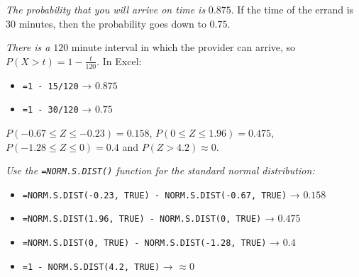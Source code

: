 \documentclass[
  11pt,
  letterpaper,
  DIV=11,
  numbers=noendperiod,
  oneside,
  open=any]{scrreprt}
\providecommand{\tightlist}{%
  \setlength{\itemsep}{0pt}\setlength{\parskip}{0pt}}\usepackage{longtable,booktabs,array}
\newenvironment{bsanswerkey}[2]{%
  \begin{tcolorbox}[bsbase, colback=bspaper2, colframe=bsline, fontupper=\small,
    title={\hypertarget{a-#1}{}\label{a-#1}\hyperlink{q-#1}{\textcolor{bsink2}{\MakeUppercase{#2}}}\hfill
      \hyperlink{q-#1}{\textcolor{bsaccent}{\normalfont\footnotesize back to page \pageref{q-#1}}}}]}%
  {\end{tcolorbox}}
\begin{document}
\begin{bsanswerkey}{bsans98}{Exercise 1, question 2}

\emph{The probability that you will arrive on time is} \(0.875\). If the
time of the errand is 30 minutes, then the probability goes down to
\(0.75\).

\emph{There is a} \(120\) minute interval in which the provider can
arrive, so \(P(X>t)=1-\frac{t}{120}\). In Excel:

\begin{itemize}
\tightlist
\item
  \texttt{=1\ -\ 15/120} → \(0.875\)
\item
  \texttt{=1\ -\ 30/120} → \(0.75\)
\end{itemize}

\end{bsanswerkey}

\begin{bsanswerkey}{bsans99}{Exercise 2, question 1}

\(P(-0.67 \leq Z \leq -0.23)=0.158\), \(P(0 \leq Z \leq 1.96)=0.475\),
\(P(-1.28 \leq Z \leq 0)=0.4\) and \(P(Z > 4.2) \approx 0\).

\emph{Use the \texttt{=NORM.S.DIST()} function for the standard normal
distribution:}

\begin{itemize}
\tightlist
\item
  \texttt{=NORM.S.DIST(-0.23,\ TRUE)\ -\ NORM.S.DIST(-0.67,\ TRUE)} →
  \(0.158\)
\item
  \texttt{=NORM.S.DIST(1.96,\ TRUE)\ -\ NORM.S.DIST(0,\ TRUE)} →
  \(0.475\)
\item
  \texttt{=NORM.S.DIST(0,\ TRUE)\ -\ NORM.S.DIST(-1.28,\ TRUE)} →
  \(0.4\)
\item
  \texttt{=1\ -\ NORM.S.DIST(4.2,\ TRUE)} → \(\approx 0\)
\end{itemize}

\end{bsanswerkey}
\end{document}
